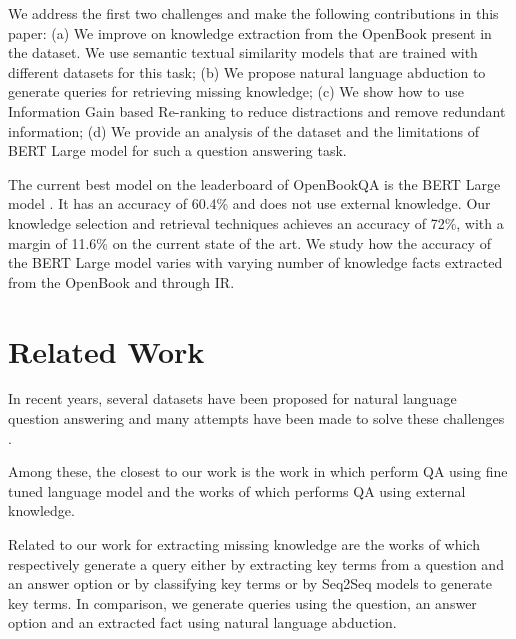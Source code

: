 \documentclass[11pt,a4paper]{article}
\begin{document}
We address the first two challenges and make the following contributions in this paper:
 (a) We improve on knowledge extraction from the OpenBook present in the dataset. We use semantic textual similarity models that are trained with different datasets for this task; (b) We propose natural language abduction to generate queries for retrieving missing knowledge; (c) We show how to use Information Gain based Re-ranking to reduce distractions and remove redundant information; (d) We provide an analysis of the dataset and the limitations of BERT Large model for such a question answering task.
 
 The current best model on the leaderboard of OpenBookQA is the BERT Large model \cite{devlin2018bert}. It has an accuracy of 60.4\% and does not use external knowledge. Our knowledge selection and retrieval techniques achieves an accuracy of 72\%, with a margin of 11.6\% on the current state of the art. We study how the accuracy of the BERT Large model varies with varying number of knowledge facts extracted from the OpenBook and through IR. 
 










\section{Related Work}
In recent years, several datasets have been proposed for natural language question answering \cite{rajpurkar2016squad,joshi2017triviaqa,khashabi2018looking,richardson2013mctest,lai2017race,reddy2018coqa,choi2018quac,tafjord2018quarel,mitra2019declarative} and many attempts have been made to solve these challenges \cite{devlin2018bert,vaswani2017attention,seo2016bidirectional}.

Among these, the closest to our work is the work in \cite{devlin2018bert} which perform QA using fine tuned language model  and the works of \cite{Sun2018ImprovingMR,zhang2018kg} which performs QA using external knowledge. 


Related to our work for extracting missing knowledge are the works of \cite{ni2018learning,musa2018answering,khashabi2017learning} which respectively generate a query either by extracting key terms from a question and an answer option or  by classifying key terms or by Seq2Seq models to generate key terms. In comparison, we generate queries using the question, an answer option and an extracted fact using natural language abduction.
    
\end{document}
